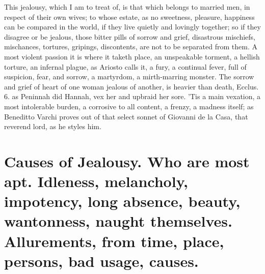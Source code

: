 This jealousy, which I am to treat of, is that which belongs to married
men, in respect of their own wives; to whose estate, as no sweetness,
pleasure, happiness can be compared in the world, if they live quietly
and lovingly together; so if they disagree or be jealous, those bitter
pills of sorrow and grief, disastrous mischiefs, mischances, tortures,
gripings, discontents, are not to be separated from them. A most
violent passion it is where it taketh place, an unspeakable torment, a
hellish torture, an infernal plague, as Ariosto calls it, a fury, a
continual fever, full of suspicion, fear, and sorrow, a martyrdom, a
mirth-marring monster. The sorrow and grief of heart of one woman
jealous of another, is heavier than death, Ecclus.  6. as
Peninnah did Hannah, vex her and upbraid her sore. 'Tis a main
vexation, a most intolerable burden, a corrosive to all content, a
frenzy, a madness itself; as Beneditto Varchi proves out of that
select sonnet of Giovanni de la Casa, that reverend lord, as he styles
him.

\section[Causes of Jealousy]{Causes of Jealousy. Who are most apt. Idleness, melancholy, impotency, long absence, beauty, wantonness, naught themselves. Allurements, from time, place, persons, bad usage, causes.}

